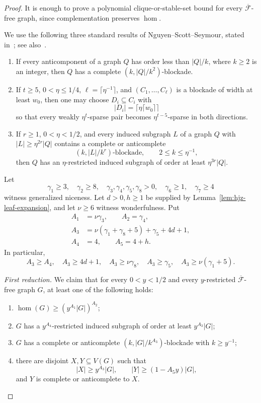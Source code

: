 \documentclass[11pt]{article}
\numberwithin{equation}{section}
\theoremstyle{plain}
\theoremstyle{definition}
\begin{document}
\begin{proof}
It is enough to prove a polynomial clique-or-stable-set bound for every
$\overline{\mathcal F}$-free graph, since complementation preserves
$\operatorname{hom}$.

We use the following three standard results of Nguyen--Scott--Seymour,
stated in~\cite[Lemmas~2.3, 2.4, and~2.6]{HuangJuZhou2026}; see
also~\cite{NguyenScottSeymourP5}.
\begin{enumerate}
\item If every anticomponent of a graph $Q$ has order less than
      $|Q|/k$, where $k\geq2$ is an integer, then $Q$ has a complete
      $(k,|Q|/k^2)$-blockade.
\item If $t\geq5$, $0<\eta\leq1/4$,
      $\ell=\lceil\eta^{-1}\rceil$, and
      $(C_1,\ldots,C_\ell)$ is a blockade of width at least $w_0$,
      then one may choose $D_i\subseteq C_i$ with
      \[
                 |D_i|=\lceil\eta\lceil w_0\rceil\rceil
      \]
      so that every weakly $\eta^t$-sparse pair becomes
      $\eta^{t-5}$-sparse in both directions.
\item If $r\geq1$, $0<\eta<1/2$, and every induced subgraph $L$ of a
      graph $Q$ with $|L|\geq\eta^{2r}|Q|$ contains a complete or
      anticomplete
      \[
                    (k,|L|/k^r)\text{-blockade},
             \qquad 2\leq k\leq\eta^{-1},
      \]
      then $Q$ has an $\eta$-restricted induced subgraph of order at
      least $\eta^{3r}|Q|$.
\end{enumerate}

Let
\[
 \gamma_1\geq3,\quad \gamma_2\geq8,\quad
 \gamma_3,\gamma_4,\gamma_5,\gamma_8>0,\quad
 \gamma_6\geq1,\quad\gamma_7\geq4
\]
witness generalized niceness.  Let $d>0,h\geq1$ be supplied by
Lemma~\ref{lem:hjz-leaf-expansion}, and let $\nu\geq6$ witness
wonderfulness.  Put
\[
 \begin{split}
 A_1&=\nu\gamma_3,\qquad A_2=\gamma_4,\\
 A_3&=\nu(\gamma_1+\gamma_8+5)+\gamma_5+4d+1,\\
 A_4&=4,\qquad A_5=4+h.
 \end{split}
\]
In particular,
\[
 A_3\geq A_4,\quad A_3\geq4d+1,\quad
 A_3\geq\nu\gamma_8,\quad A_3\geq\gamma_5,\quad
 A_3\geq\nu(\gamma_1+5).
\]

\medskip
\noindent\emph{First reduction.}
We claim that for every $0<y<1/2$ and every $y$-restricted
$\overline{\mathcal F}$-free graph $G$, at least one of the following
holds:
\begin{enumerate}[label=(S\arabic*)]
\item $\operatorname{hom}(G)\geq(y^{A_1}|G|)^{A_2}$;
\item $G$ has a $y^{A_4}$-restricted induced subgraph of order at
      least $y^{A_3}|G|$;
\item $G$ has a complete or anticomplete
      $(k,|G|/k^{A_3})$-blockade with $k\geq y^{-1}$;
\item there are disjoint $X,Y\subseteq V(G)$ such that
      \[
       |X|\geq y^{A_3}|G|,\qquad
       |Y|\geq(1-A_5y)|G|,
      \]
      and $Y$ is complete or anticomplete to $X$.
\end{enumerate}


\end{proof}
\end{document}
